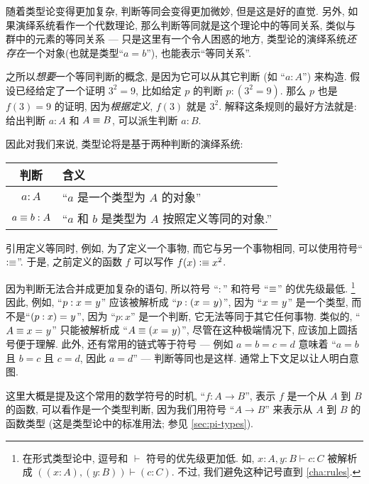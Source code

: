 随着类型论变得更加复杂, 判断等同会变得更加微妙, 但是这是好的直觉. 另外, 如果演绎系统看作一个代数理论, 那么判断等同就是这个理论中的等同关系, 类似与群中的元素的等同关系 --- 只是这里有一个令人困惑的地方, 类型论的演绎系统\emph{还}\emph{存在}一个对象(也就是类型``$a=b$''), 也能表示``等同关系''.

之所以\emph{想要}一个等同判断的概念, 是因为它可以从其它判断 (如 ``$a:A$'') 来构造. 假设已经给定了一个证明 $3^2=9$, 比如给定 $p$ 的判断 $p:(3^2=9)$. 那么 $p$ 也是 $f(3)=9$ 的证明, 因为\emph{根据定义}, $f(3)$ 就是 $3^2$. 解释这条规则的最好方法就是: 给出判断 $a:A$ 和 $A\equiv B$, 可以派生判断 $a:B$.

因此对我们来说, 类型论将是基于两种判断的演绎系统: \begin{center}
                               \medskip
                               \begin{tabular}{cl}
                                   \toprule
                                   判断 &含义\\
                                   \midrule
                                   $a : A$ &``$a$ 是一个类型为 $A$  的对象''\\
                                   $a \equiv b : A$ &``$a$ 和 $b$ 是类型为 $A$ 按照定义等同的对象.''\\
                                   \bottomrule
                               \end{tabular}
                               \medskip
\end{center}
%
%
引用定义等同时, 例如, 为了定义一个事物, 而它与另一个事物相同, 可以使用符号``$\vcentcolon\equiv$''. 于是, 之前定义的函数 $f$ 可以写作 $f(x)\vcentcolon\equiv x^2$.

因为判断无法合并成更加复杂的语句, 所以符号 ``$:$'' 和符号 ``$\equiv$'' 的优先级最低. \footnote{在形式类型论中, 逗号和 $\vdash$ 符号的优先级更加低.%
如, $x:A,y:B\vdash c:C$ 被解析成 $((x:A),(y:B))\vdash (c:C)$. 不过, 我们避免这种记号直到 \cref{cha:rules}.} 因此, 例如, ``$p:x =_{} y$'' 应该被解析成 ``$p:(x =_{} y)$'', 因为 ``$x =_{} y$'' 是一个类型, 而不是``$(p:x) =_{} y$'', 因为 ``$p:x$'' 是一个判断, 它无法等同于其它任何事物. 类似的, ``$A\equiv x =_{} y$'' 只能被解析成 ``$A\equiv(x =_{} y)$'',  尽管在这种极端情况下, 应该加上圆括号便于理解. 此外, 还有常用的链式等于符号 --- 例如 $a=b=c=d$ 意味着 ``$a=b$ 且 $b=c$ 且 $c=d$, 因此 $a=d$'' --- 判断等同也是这样. 通常上下文足以让人明白意图.

这里大概是提及这个常用的数学符号的时机, ``$f:A\to B$'', 表示 $f$ 是一个从  $A$ 到 $B$ 的函数, 可以看作是一个类型判断, 因为我们用符号  ``$A\to B$'' 来表示从  $A$ 到 $B$ 的函数类型 (这是类型论中的标准用法; 参见 \cref{sec:pi-types}).

